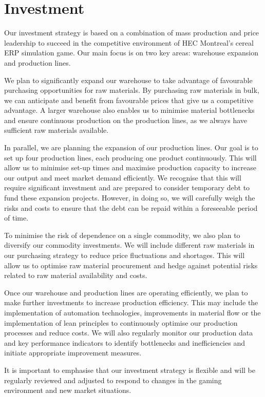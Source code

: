 \documentclass{article}
\begin{document}
	\section*{Investment}
	Our investment strategy is based on a combination of mass production and price leadership to succeed in the competitive environment of HEC Montreal's cereal ERP simulation game. Our main focus is on two key areas: warehouse expansion and production lines.
	
	We plan to significantly expand our warehouse to take advantage of favourable purchasing opportunities for raw materials. By purchasing raw materials in bulk, we can anticipate and benefit from favourable prices that give us a competitive advantage. A larger warehouse also enables us to minimise material bottlenecks and ensure continuous production on the production lines, as we always have sufficient raw materials available.
	
	In parallel, we are planning the expansion of our production lines. Our goal is to set up four production lines, each producing one product continuously. This will allow us to minimise set-up times and maximise production capacity to increase our output and meet market demand efficiently. We recognise that this will require significant investment and are prepared to consider temporary debt to fund these expansion projects. However, in doing so, we will carefully weigh the risks and costs to ensure that the debt can be repaid within a foreseeable period of time.
	
	To minimise the risk of dependence on a single commodity, we also plan to diversify our commodity investments. We will include different raw materials in our purchasing strategy to reduce price fluctuations and shortages. This will allow us to optimise raw material procurement and hedge against potential risks related to raw material availability and costs.
	
	Once our warehouse and production lines are operating efficiently, we plan to make further investments to increase production efficiency. This may include the implementation of automation technologies, improvements in material flow or the implementation of lean principles to continuously optimise our production processes and reduce costs. We will also regularly monitor our production data and key performance indicators to identify bottlenecks and inefficiencies and initiate appropriate improvement measures.
	
	It is important to emphasise that our investment strategy is flexible and will be regularly reviewed and adjusted to respond to changes in the gaming environment and new market situations.
	
\end{document}

